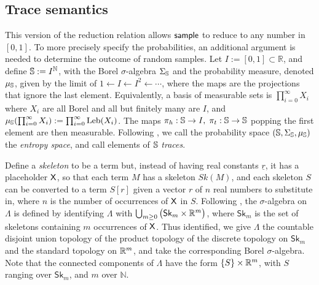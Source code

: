 \subsection{Trace semantics}
\label{sec:sampling semantics}
This version of the reduction relation allows $\mathsf{sample}$ to reduce to any number in $[0,1]$. 
To more precisely specify the probabilities, an additional argument is needed to determine the outcome of random samples. Let $ I := [0,1] \subset \mathbb{R} $, and define ${\mathbb{S}} := I^{\mathbb{N}}$, with the Borel $\sigma$-algebra $\Sigma_{\mathbb{S}}$ and the probability measure, denoted $\mu_{{\mathbb{S}}}$, given by the limit of $1 \gets I \gets I^2 \gets \cdots$, where the maps are the projections that ignore the last element. Equivalently, a basis of measurable sets is $\prod_{i=0}^\infty X_i$ where $X_i$ are all Borel and all but finitely many are $I$, and $\mu_{{\mathbb{S}}} (\prod_{i=0}^\infty X_i) := \prod_{i=0}^\infty \mathrm{Leb}(X_i)$.
The maps $\pi_h:{\mathbb{S}} \to I, \; \pi_t:{\mathbb{S}} \to {\mathbb{S}}$ popping the first element are then measurable.
Following \cite{DBLP:conf/esop/CulpepperC17}, we call the probability space $({\mathbb{S}}, \Sigma_{\mathbb{S}}, \mu_{{\mathbb{S}}})$ the \emph{entropy space}, and call elements of ${\mathbb{S}}$ \emph{traces}.

Define a \emph{skeleton} to be a term but, instead of having real constants $\underline r$, it has a placeholder $\mathsf{X}$, so that each term $M$ has a skeleton $\mathit{Sk}(M)$, and each skeleton $S$ can be converted to a term $S[r]$ given a vector $r$ of $n$ real numbers to substitute in, where $n$ is the number of occurrences of $\mathsf{X}$ in $S$. 
Following \cite{DBLP:conf/icfp/BorgstromLGS16,DBLP:conf/lics/StatonYWHK16,DBLP:journals/pacmpl/EhrhardPT18}, the $\sigma$-algebra on $\Lambda$ is defined by identifying $\Lambda$ with $\bigcup_{m\geq 0} \big(\mathsf{Sk}_m \times \mathbb{R}^m \big)$, where $\mathsf{Sk}_m$ is the set of skeletons containing $m$ occurrences of $\mathsf{X}$.
Thus identified, we give $\Lambda$ the countable disjoint union topology of the product topology of the discrete topology on $\mathsf{Sk}_m$ and the standard topology on $\mathbb{R}^m$, and take the corresponding Borel $\sigma$-algebra.
Note that the connected components of $\Lambda$ have the form $\{S\} \times \mathbb{R}^m$, with $S$ ranging over $\mathsf{Sk}_m$, and $m$ over $\mathbb{N}$.

